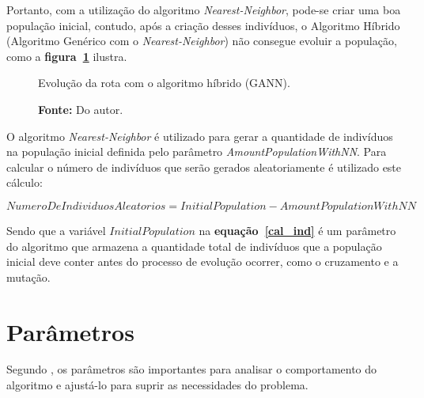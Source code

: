 \documentclass[12pt,openright,a4paper,twoside]{tcc}
\begin{document}
		Portanto, com a utilização do algoritmo \textit{Nearest-Neighbor}, pode-se criar uma boa população inicial, contudo, após a criação desses indivíduos, o Algoritmo Híbrido (Algoritmo Genérico com o  \textit{Nearest-Neighbor}) não consegue evoluir a população, como a \textbf{figura~\ref{figagnn}} ilustra.  

		\begin{figure}[h]
			\centering
            \caption{Evolução da rota com o algoritmo híbrido (GANN).}
			\caption*{\textbf{Fonte:} Do autor.}
			\label{figagnn}
		\end{figure}


		O algoritmo \textit{Nearest-Neighbor} é utilizado para gerar a quantidade de indivíduos na população inicial definida pelo parâmetro \textit{AmountPopulationWithNN}. Para calcular o número de indivíduos que serão gerados aleatoriamente é utilizado este cálculo:

			\begin{equation}
				\label{cal_ind}
		 		NumeroDeIndividuosAleatorios = InitialPopulation - AmountPopulationWithNN 
		 	\end{equation} 
		
		Sendo que a variável $InitialPopulation$ na \textbf{equação~\ref{cal_ind}} é um parâmetro do algoritmo que armazena a quantidade total de indivíduos que a população inicial deve conter antes do processo de evolução ocorrer, como o cruzamento e a mutação.

        \section{Parâmetros}
        
        Segundo , os parâmetros são importantes para analisar o comportamento do algoritmo e ajustá-lo para suprir as necessidades do problema. 
        
\end{document}
